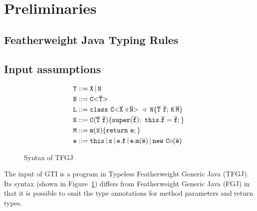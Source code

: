 \section{Preliminaries}
\label{sec:preliminaries}

\subsection{Featherweight Java Typing Rules}


\subsection{Input assumptions}
\begin{figure}[tp]
\begin{align*}
  \tt T &::= \tt X \, | \, \tt N \\
  \tt N &::= \mathtt{C {\tt <} \overline{\tt T} {\tt >} \ }\\
  \tt L &::= \mathtt{class} \ \mathtt{C {\tt <} \overline{\tt X} \triangleleft \overline{\tt N} {\tt >} \ }
             \triangleleft \ \tt N \{ \overline{\tt T} \ \overline{\tt f}; \,\tt K \, \overline{\tt M} \} \\
  \tt K &::= \tt C(\overline{\tt T} \ \overline{\tt f})\{\mathtt{super}(\overline{\tt f}); \ \mathtt{this}.\overline{\tt f}=\overline{\tt f};\} \\
  \tt M &::= \mathtt{m}(\overline{\tt x})\{ \mathtt{ return}\ \tt e; \} \\
  \tt e &::= \mathtt{this} \, | \, \tt x \, | \, \tt e.\tt f \, | \,
             \tt e.\mathtt{m}(\overline{\tt e}) \, | \, \mathtt{new}\ \mathtt{C}{\diamond}(\overline{\tt e})
\end{align*}
  \caption{Syntax of TFGJ}
  \label{fig:syntax-tfgj}
\end{figure}
The input of GTI is a
program in Typeless Featherweight Generic Java (TFGJ). Its syntax
(shown in Figure~\ref{fig:syntax-tfgj}) differs
from Featherweight Generic Java (FGJ) in that it is possible to omit
the type annotations for method parameters and return types.%




